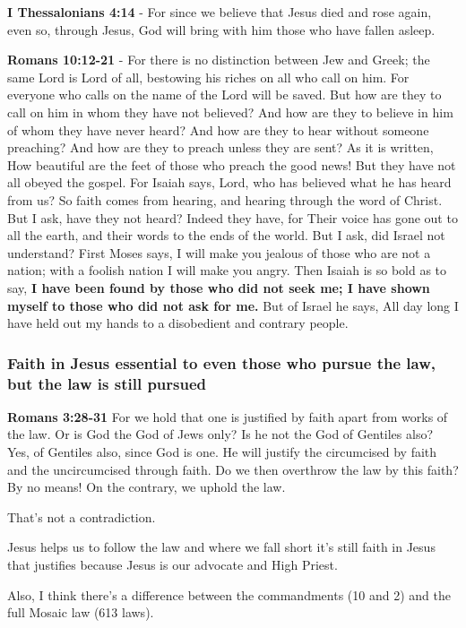 \documentclass[11pt]{article}
\begin{document}
\textbf{I Thessalonians 4:14} - For since we believe that Jesus died and rose again, even so, through Jesus, God will bring with him those who have fallen asleep.

\textbf{Romans 10:12-21} - For there is no distinction between Jew and Greek; the same Lord is Lord of all, bestowing his riches on all who call on him.  For everyone who calls on the name of the Lord will be saved.  But how are they to call on him in whom they have not believed? And how are they to believe in him of whom they have never heard? And how are they to hear without someone preaching?  And how are they to preach unless they are sent? As it is written, How beautiful are the feet of those who preach the good news!  But they have not all obeyed the gospel. For Isaiah says, Lord, who has believed what he has heard from us?  So faith comes from hearing, and hearing through the word of Christ.  But I ask, have they not heard? Indeed they have, for Their voice has gone out to all the earth, and their words to the ends of the world.  But I ask, did Israel not understand? First Moses says, I will make you jealous of those who are not a nation; with a foolish nation I will make you angry.  Then Isaiah is so bold as to say, \textbf{I have been found by those who did not seek me; I have shown myself to those who did not ask for me.} But of Israel he says, All day long I have held out my hands to a disobedient and contrary people.

\subsubsection{Faith in Jesus essential to even those who pursue the law, but the law is still pursued}
\label{sec:org2e8fa31}
\textbf{Romans 3:28-31} For we hold that one is justified by faith apart from works of the law.  Or is God the God of Jews only? Is he not the God of Gentiles also? Yes, of Gentiles also, since God is one. He will justify the circumcised by faith and the uncircumcised through faith.  Do we then overthrow the law by this faith? By no means! On the contrary, we uphold the law.

That's not a contradiction.

Jesus helps us to follow the law and where we fall short it's still faith in Jesus that justifies because Jesus is our advocate and High Priest.

Also, I think there's a difference between the commandments (10 and 2) and the full Mosaic law (613 laws).
\end{document}
